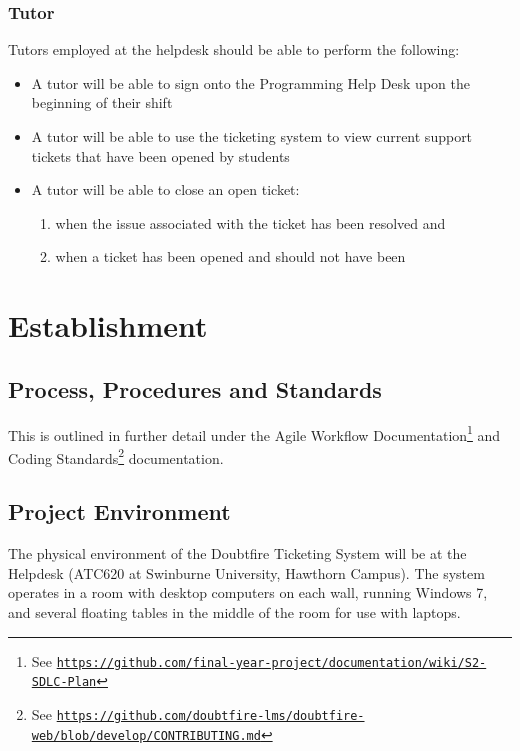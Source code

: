\documentclass[12pt,a4paper,]{article}
\renewcommand{\href}[2]{#2\footnote{See \texttt{\url{#1}}}}
\providecommand{\tightlist}{%
  \setlength{\itemsep}{0pt}\setlength{\parskip}{0pt}}
\begin{document}
\subsubsection{Tutor}\label{tutor}

Tutors employed at the helpdesk should be able to perform the following:

\begin{itemize}
\tightlist
\item
  A tutor will be able to sign onto the Programming Help Desk upon the
  beginning of their shift
\item
  A tutor will be able to use the ticketing system to view current
  support tickets that have been opened by students
\item
  A tutor will be able to close an open ticket:

  \begin{enumerate}
  \def\labelenumi{(\alph{enumi})}
  \tightlist
  \item
    when the issue associated with the ticket has been resolved and
  \item
    when a ticket has been opened and should not have been
  \end{enumerate}
\end{itemize}

\section{Establishment}\label{establishment}

\subsection{Process, Procedures and
Standards}\label{process-procedures-and-standards}

This is outlined in further detail under the
\href{https://github.com/final-year-project/documentation/wiki/S2-SDLC-Plan}{Agile
Workflow Documentation} and
\href{https://github.com/doubtfire-lms/doubtfire-web/blob/develop/CONTRIBUTING.md}{Coding
Standards} documentation.

\subsection{Project Environment}\label{project-environment}

The physical environment of the Doubtfire Ticketing System will be at
the Helpdesk (ATC620 at Swinburne University, Hawthorn Campus). The
system operates in a room with desktop computers on each wall, running
Windows 7, and several floating tables in the middle of the room for use
with laptops.
\end{document}
